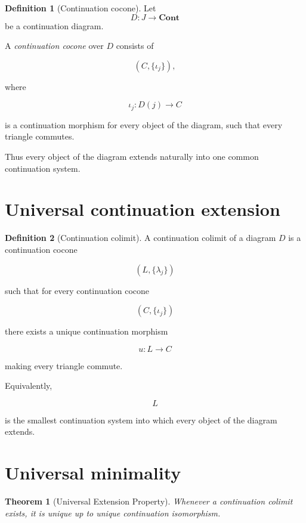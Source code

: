 \documentclass[13pt,openany]{book}
\theoremstyle{plain}
\newtheorem{theorem}{Theorem}[chapter]
\theoremstyle{definition}
\newtheorem{definition}{Definition}[chapter]
\begin{document}
\begin{definition}[Continuation cocone]
Let
\[
D:J\longrightarrow\mathbf{Cont}
\]
be a continuation diagram.

A \emph{continuation cocone} over \(D\) consists of

\[
(C,\{\iota_j\}),
\]

where

\[
\iota_j:D(j)\longrightarrow C
\]

is a continuation morphism for every object of the diagram, such that every
triangle commutes.
\end{definition}

Thus every object of the diagram extends naturally into one common continuation
system.

\section{Universal continuation extension}

\begin{definition}[Continuation colimit]
A continuation colimit of a diagram \(D\) is a continuation cocone

\[
(L,\{\lambda_j\})
\]

such that for every continuation cocone

\[
(C,\{\iota_j\})
\]

there exists a unique continuation morphism

\[
u:L\longrightarrow C
\]

making every triangle commute.
\end{definition}

Equivalently,

\[
L
\]

is the smallest continuation system into which every object of the diagram
extends.

\section{Universal minimality}

\begin{theorem}[Universal Extension Property]
Whenever a continuation colimit exists, it is unique up to unique continuation
isomorphism.
\end{theorem}
\end{document}
